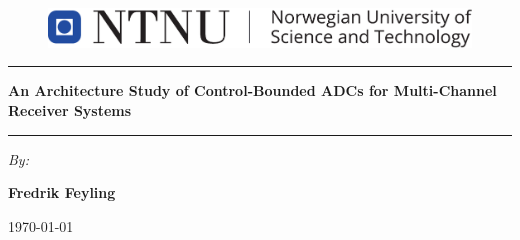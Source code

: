 
\begin{titlepage}
\begin{center}
    \begin{figure}
        \centering
        \includegraphics[width=0.8\linewidth]{figures/misc/ntnu_logo.pdf}
    \end{figure}

    \vspace*{2cm}

    \noindent\rule{\textwidth}{0.4pt}


    \LARGE \textbf{An Architecture Study of Control-Bounded ADCs for Multi-Channel Receiver Systems}

    \noindent\rule{\textwidth}{0.4pt}

    \vspace{2cm}

    \large \textit{By:}

    \Large \textbf{Fredrik Feyling}

    \vfill


    \large \today

\end{center}
\end{titlepage}



